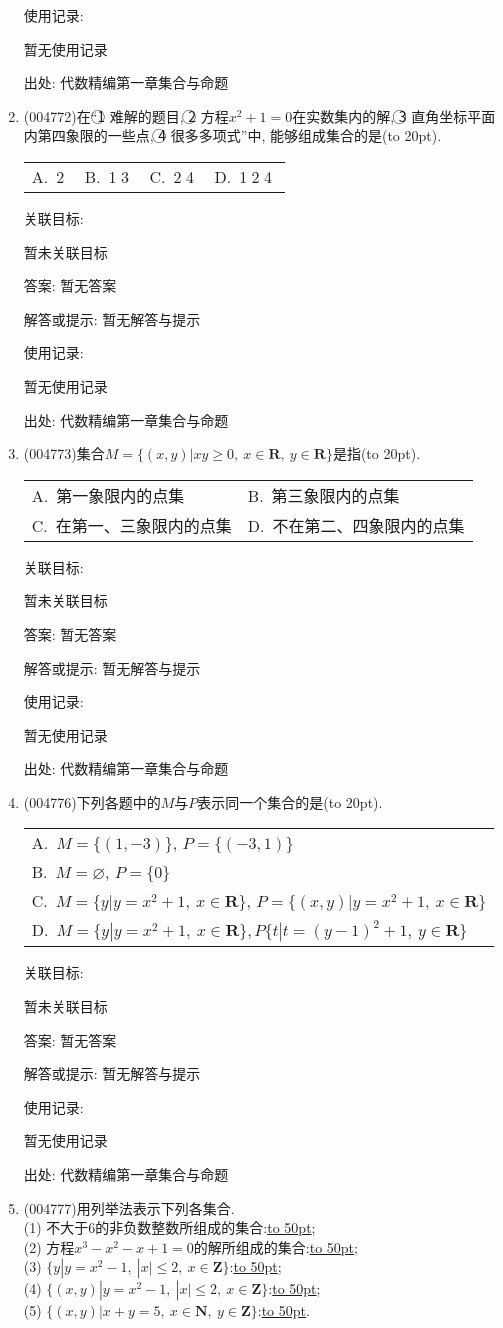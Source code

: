\documentclass[10pt,a4paper]{article}
\newcommand{\blank}[1]{\underline{\hbox to #1pt{}}}
\newcommand{\bracket}[1]{(\hbox to #1pt{})}
\newcommand{\onech}[4]{\par\begin{tabular}{p{.9\textwidth}}
A.~#1\\
B.~#2\\
C.~#3\\
D.~#4
\end{tabular}}
\newcommand{\twoch}[4]{\par\begin{tabular}{p{.46\textwidth}p{.46\textwidth}}
A.~#1& B.~#2\\
C.~#3& D.~#4
\end{tabular}}
\newcommand{\fourch}[4]{\par\begin{tabular}{p{.23\textwidth}p{.23\textwidth}p{.23\textwidth}p{.23\textwidth}}
A.~#1 &B.~#2& C.~#3& D.~#4
\end{tabular}}
\begin{document}
\begin{enumerate}[1.]
使用记录:

暂无使用记录


出处: 代数精编第一章集合与命题
\item { (004772)}在``\textcircled{1} 难解的题目, \textcircled{2} 方程$x^2+1=0$在实数集内的解, \textcircled{3} 直角坐标平面内第四象限的一些点, \textcircled{4} 很多多项式''中, 能够组成集合的是\bracket{20}.
\fourch{\textcircled{2}}{\textcircled{1}\textcircled{3}}{\textcircled{2}\textcircled{4}}{\textcircled{1}\textcircled{2}\textcircled{4}}


关联目标:

暂未关联目标

答案: 暂无答案

解答或提示: 暂无解答与提示

使用记录:

暂无使用记录


出处: 代数精编第一章集合与命题
\item { (004773)}集合$M=\{(x,y)|xy\ge 0,\ x\in \mathbf{R},\ y\in \mathbf{R}\}$是指\bracket{20}.
\twoch{第一象限内的点集}{第三象限内的点集}{在第一、三象限内的点集}{不在第二、四象限内的点集}


关联目标:

暂未关联目标

答案: 暂无答案

解答或提示: 暂无解答与提示

使用记录:

暂无使用记录


出处: 代数精编第一章集合与命题
\item { (004776)}下列各题中的$M$与$P$表示同一个集合的是\bracket{20}.
\onech{$M=\{(1,-3)\}$, $P=\{(-3,1)\}$}{$M=\varnothing$, $P=\{0\}$}{$M=\{y|y=x^2+1, \ x\in \mathbf{R}\}$, $P=\{(x,y)|y=x^2+1, \ x\in \mathbf{R}\}$}{$M=\{y|y=x^2+1,\ x\in \mathbf{R}\},P\{t|t=(y-1)^2+1, \ y\in \mathbf{R}\}$}


关联目标:

暂未关联目标

答案: 暂无答案

解答或提示: 暂无解答与提示

使用记录:

暂无使用记录


出处: 代数精编第一章集合与命题
\item { (004777)}用列举法表示下列各集合.\\
(1) 不大于$6$的非负数整数所组成的集合:\blank{50};\\
(2) 方程$x^3-x^2-x+1=0$的解所组成的集合:\blank{50};\\
(3) $\{y|y=x^2-1, \ |x|\le 2, \ x\in \mathbf{Z}\}$:\blank{50};\\
(4) $\{(x,y)|y =x^2-1, \  |x|\le 2,\ x\in \mathbf{Z}\}$:\blank{50};\\
(5) $\{(x,y)|x+y=5, \ x\in \mathbf{N},\ y\in \mathbf{Z}\}$:\blank{50}.



\end{enumerate}
\end{document}
